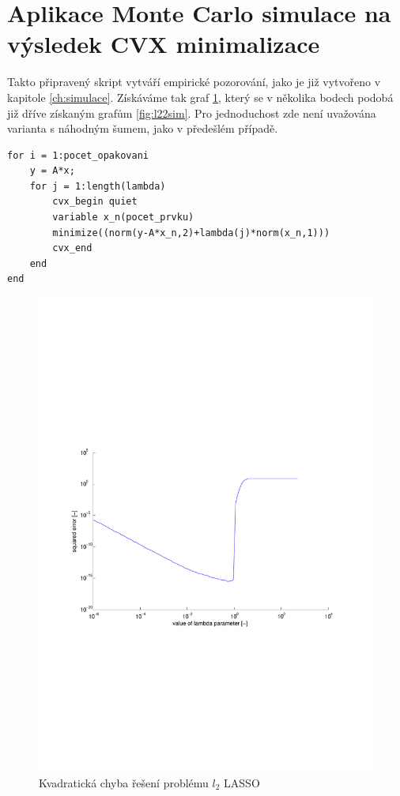 \documentclass[FM,BP]{tulthesis}
\begin{document}
\section{Aplikace Monte Carlo simulace na výsledek CVX minimalizace}
Takto připravený skript vytváří empirické pozorování, jako je již vytvořeno v kapitole \ref{ch:simulace}. Získáváme tak graf \ref{fig:l2}, který se v několika bodech podobá již dříve získaným grafům \ref{fig:l22sim}. Pro jednoduchost zde není uvažována varianta s náhodným šumem, jako v předešlém případě.

\begin{lstlisting}
for i = 1:pocet_opakovani
    y = A*x;
    for j = 1:length(lambda)
        cvx_begin quiet
        variable x_n(pocet_prvku)
        minimize((norm(y-A*x_n,2)+lambda(j)*norm(x_n,1)))
        cvx_end
    end
end
\end{lstlisting}

\begin{figure}[!ht]
	\begin{center}
		\includegraphics[scale=0.7]{obr/l2.pdf}
	\end{center}
	\caption{Kvadratická chyba řešení problému $l_2$ LASSO}
	\label{fig:l2}
\end{figure}
\end{document}

